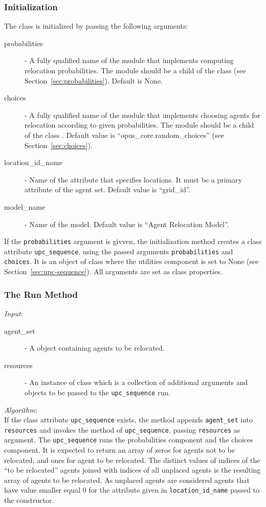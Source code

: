 %
\subsubsection{Initialization}
%
The class is initialized by passing the following arguments:
\begin{description}
\item[probabilities] - A fully qualified name of the module that implements
  computing relocation probabilities. The module should be a child of the
   class  (see Section~\ref{sec:probabilities}). 
  Default is None.
\item[choices] - A fully qualified name of the module that implements choosing
  agents for relocation according to given probabilities. The module should be
  a child of the  class .  Default value is
  ``opus_core.random_choices'' (see Section~\ref{sec:choices}).
\item[location_id_name] - Name of the attribute that specifies locations. It
  must be a primary attribute of the agent set. Default value is
  ``grid_id''.
\item[model_name] - Name of the model. Default value is ``Agent Relocation
  Model''. 
\end{description}
If the \verb|probabilities| argument is givven, 
the initialization method creates a class attribute \verb|upc_sequence|, using
the passed arguments \verb|probabilities| and \verb|choices|. It is an object
of class  where the utilities component is set to None
(see Section~\ref{sec:upc-sequence}). All arguments are set as class properties. 

%
\subsubsection{The Run Method}
%
{\it Input}:
\begin{description}
\item[agent_set] - A  object containing agents to be relocated.
\item[resources] - An instance of class  which is a
  collection of additional arguments and objects to be passed to the
  \verb|upc_sequence| run.
\end{description}

{\it Algorithm}:~\\[1mm]
If the class attribute \verb|upc_sequence| exists, the method appends \verb|agent_set| 
into \verb|resources| and invokes the
 method of \verb|upc_sequence|, passing \verb|resources| as
argument. The \verb|upc_sequence| runs the probabilities component and the
choices component. It is expected to return an array of zeros for agents
not to be relocated, and ones for agent to be relocated. The distinct values
of indices of the ``to be relocated'' agents joined with indices of all
unplaced agents is the resulting array of agents to be relocated. As unplaced
agents are considered agents that have value smaller equal 0 for the attribute 
given in \verb|location_id_name| passed to the constructor. 

